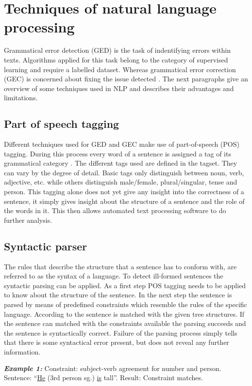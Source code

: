 \documentclass[runningheads]{llncs}
\begin{document}
\section{Techniques of natural language processing}
Grammatical error detection (GED) is the task of indentifying errors within texts. Algorithms applied for this task belong to the category of supervised learning and require a labelled dataset. Whereas grammatical error correction (GEC) is concerned about fixing the issue detected \cite{bell_context_2019}. The next paragraphs give an overview of some techniques used in NLP and describes their advantages and limitations.

\subsection{Part of speech tagging}
Different techniques used for GED and GEC make use of part-of-speech (POS) tagging. During this process every word of a sentence is assigned a tag of its grammatical category \citep{noauthor_pos_2018}. The different tags used are defined in the tagset. They can vary by the degree of detail. Basic tags only distinguish between noun, verb, adjective, etc. while others distinguish male/female, plural/singular, tense and person. This tagging alone does not yet give any insight into the correctness of a sentence, it simply gives insight about the structure of a sentence and the role of the words in it. This then allows automated text processing software to do further analysis.

\subsection{Syntactic parser}   
The rules that describe the structure that a sentence has to conform with, are referred to as the syntax of a language. To detect ill-formed sentences the syntactic parsing can be applied. As a first step POS tagging needs to be applied to know about the structure of the sentence. In the next step the sentence is parsed by means of predefined constraints which resemble the rules of the specific language. According to \textcite{manchanda_various_2016} the sentence is matched with the given tree structures. If the sentence can matched with the constraints available the parsing succeeds and the sentence is syntactically correct. Failure of the parsing process simply tells that there is some syntactical error present, but does not reveal any further information.

\textbf{\textit{Example 1:}} Constraint: subject-verb agreement for number and person. Sentence: ``\underline{He} (3rd person sg.) \underline{is} tall''. Result: Constraint matches.
\end{document}
